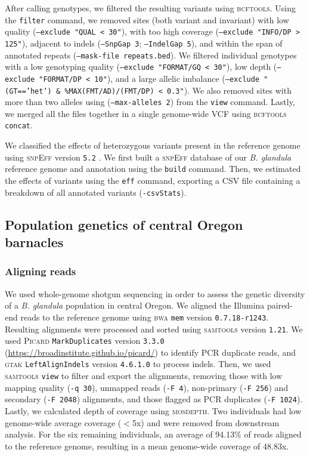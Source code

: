 \documentclass[11pt]{article}
\newcommand{\bgla}{\textit{B. glandula}\xspace}
\begin{document}
After calling genotypes, we filtered the resulting variants using \textsc{bcftools}.
Using the \texttt{filter} command, we removed sites (both variant and invariant) with
low quality (\texttt{--exclude "QUAL < 30"}), with too high coverage (\texttt{--exclude
"INFO/DP > 125"}), adjacent to indels (\texttt{--SnpGap 3}; \texttt{--IndelGap 5}), and
within the span of annotated repeats (\texttt{--mask-file repeats.bed}). We filtered
individual genotypes with a low genotyping quality (\texttt{--exclude "FORMAT/GQ < 30"}),
low depth (\texttt{--exclude "FORMAT/DP < 10"}), and a large allelic imbalance
(\texttt{--exclude "(GT=='het') \& \%MAX(FMT/AD)/(FMT/DP) < 0.3"}).
We also removed sites with more than two alleles using (\texttt{--max-alleles 2}) from
the \texttt{view} command.
Lastly, we merged all the files together in a single genome-wide VCF using
\textsc{bcftools} \texttt{concat}.
\vspace{0.2cm}

We classified the effects of heterozygous variants present in the reference genome using
\textsc{snpEff} version \texttt{5.2} \citep{cingolani_program_2012}.
We first built a \textsc{snpEff} database of our \bgla{} reference genome and annotation
using the \texttt{build} command.
Then, we estimated the effects of variants using the \texttt{eff} command, exporting a
CSV file containing a breakdown of all annotated variants (\texttt{-csvStats}).

\subsection*{Population genetics of central Oregon barnacles}\label{sec:methods_popgen}

\subsubsection*{Aligning reads}

We used whole-genome shotgun sequencing in order to assess the genetic diversity of
a \bgla{} population in central Oregon.
We aligned the Illumina paired-end reads to the reference genome using \textsc{bwa}
\texttt{mem} version \texttt{0.7.18-r1243}.
Resulting alignments were processed and sorted using \textsc{samtools} version
\texttt{1.21}.
We used \textsc{Picard} \texttt{MarkDuplicates} version \texttt{3.3.0}
(\url{https://broadinstitute.github.io/picard/}) to identify PCR duplicate reads, and
\textsc{gtak} \texttt{LeftAlignIndels} version \texttt{4.6.1.0}
\citep{mckenna_gatk_2010,depristo_framework_2011} to process indels.
Then, we used \textsc{samtools} \texttt{view} to filter and export the alignments,
removing those with low mapping quality (\texttt{-q 30}), unmapped reads (\texttt{-F 4}),
non-primary (\texttt{-F 256}) and secondary (\texttt{-F 2048}) alignments, and those
flagged as PCR duplicates (\texttt{-F 1024}).
Lastly, we calculated depth of coverage using \textsc{mosdepth}.
Two individuals had low genome-wide average coverage ($<$5x) and were removed from
downstream analysis.
For the six remaining individuals, an average of 94.13\% of reads aligned to the 
reference genome, resulting in a mean genome-wide coverage of 48.83x.
\end{document}
